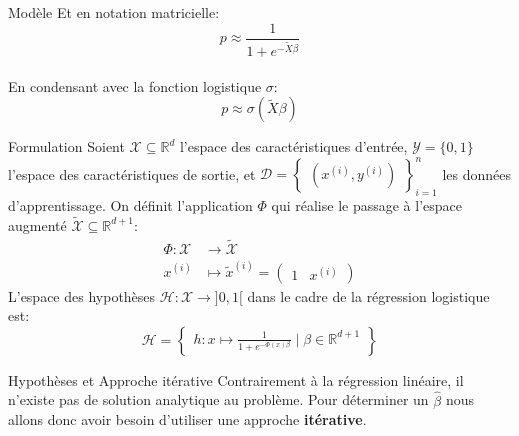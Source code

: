 \documentclass[10pt]{beamer}  %
\begin{document}
\begin{frame}{Modèle}
	Et en notation matricielle:
	\begin{equation}
		p \approx \frac{1}{1 + e^{\displaystyle -\tilde{X} \beta}}
		\nonumber
	\end{equation} \\
	\vspace{0.5cm}
	En condensant avec la fonction logistique $\sigma$:
	\begin{equation}
		p \approx \sigma\left(\tilde{X} \beta\right)
		\nonumber
	\end{equation}
\end{frame}

\begin{frame}{Formulation}
	Soient $\mathcal{X} \subseteq \mathbb{R}^d$ l'espace des caractéristiques d'entrée,  $\mathcal{Y} = \{0, 1\}$ l'espace des caractéristiques de sortie, et $\mathcal{D} = \begin{Bmatrix}(x^{(i)}, y^{(i)})\end{Bmatrix}_{i=1}^n$ les données d'apprentissage. On définit l'application $\Phi$ qui réalise le passage à l'espace augmenté $\tilde{\mathcal{X}} \subseteq \mathbb{R}^{d+1}$:
	\begin{equation}
		\begin{aligned}
			\Phi: \mathcal{X} &\to \tilde{\mathcal{X}} \\
			x^{(i)} &\mapsto \tilde{x}^{(i)} = \begin{pmatrix}1 & x^{(i)}\end{pmatrix}
			\nonumber
		\end{aligned}
	\end{equation}
	L'espace des hypothèses $\mathcal{H}: \mathcal{X} \to ]0, 1[$ dans le cadre de la régression logistique est:
	\begin{equation}
		\mathcal{H} = \begin{Bmatrix}h: x \mapsto \displaystyle \frac{1}{1 + e^{-\Phi(x) \beta}} \mid \beta \in \mathbb{R}^{d+1}\end{Bmatrix}
		\nonumber
	\end{equation}
\end{frame}

\begin{frame}{Hypothèses et Approche itérative}
	Contrairement à la régression linéaire, il n'existe pas de solution analytique au problème. Pour déterminer un $\hat{\beta}$ nous allons donc avoir besoin d'utiliser une approche \textbf{itérative}. \\
\end{frame}
\end{document}
